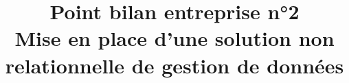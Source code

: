 
\def\presentation{Point bilan entreprise n°2}
\def\bottomTitle{Soutenance de PFE}
\def\noteAboutAuthor{BARRO Lissy Maxime}
\def\subject{Mise en place d'une solution non relationnelle de gestion de données}
\title[\bottomTitle]{
        {\bfseries \huge \presentation\\} 
        {\bfseries \subject}\\   
}

\author[~~\noteAboutAuthor ~- 3ème Année GL ~~~]{}
